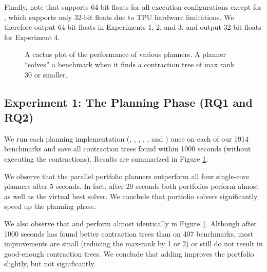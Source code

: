 Finally, note that  supports 64-bit floats for all execution configurations except for , which supports only 32-bit floats due to TPU hardware limitations. We therefore output 64-bit floats in Experiments 1, 2, and 3, and output 32-bit floats for Experiment 4.

\begin{figure}
	\centering
	
    \vspace*{-0.9cm}
	\caption{\label{fig:parallel:planning} A cactus plot of the performance of various planners. A planner ``solves'' a benchmark when it finds a contraction tree of max rank 30 or smaller.}
\end{figure}

\subsection{Experiment 1: The Planning Phase (RQ1 and RQ2)}
We run each planning implementation (, , , , , and ) once on each of our 1914 benchmarks and save all contraction trees found within 1000 seconds (without executing the contractions). Results are summarized in Figure \ref{fig:parallel:planning}. 


%


We observe that the parallel portfolio planners outperform all four single-core planners after 5 seconds. In fact, after 20 seconds both portfolios perform almost as well as the virtual best solver. We conclude that portfolio solvers significantly speed up the planning phase.

We also observe that  and  perform almost identically in Figure \ref{fig:parallel:planning}. Although after 1000 seconds  has found better contraction trees than  on 407 benchmarks, most improvements are small (reducing the max-rank by 1 or 2) or still do not result in good-enough contraction trees. We conclude that adding  improves the portfolio slightly, but not significantly.
 
